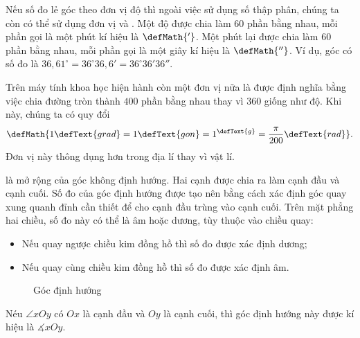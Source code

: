 Nếu số đo lẻ góc theo đơn vị độ thì ngoài việc sử dụng số thập phân, chúng ta còn có thể sử dụng đơn vị  và . Một độ được chia làm $60$ phần bằng nhau, mỗi phần gọi là một phút kí hiệu là $\defMath{'}$. Một phút lại được chia làm $60$ phần bằng nhau, mỗi phần gọi là một giây kí hiệu là $\defMath{''}$. Ví dụ, góc có số đo là $36{,}61^\circ = 36^\circ 36{,}6' = 36^\circ 36' 36''$.

Trên máy tính khoa học hiện hành còn một đơn vị nữa là  được định nghĩa bằng việc chia đường tròn thành $400$ phần bằng nhau thay vì $360$ giống như độ. Khi này, chúng ta có quy đổi $$\defMath{1\defText{ grad} = 1\defText{ gon} = 1^\defText{ g} = \frac{\pi}{200}\defText{ rad}}.$$
Đơn vị này thông dụng hơn trong địa lí thay vì vật lí.

 là mở rộng của góc không định hướng. Hai cạnh được chia ra làm cạnh đầu và cạnh cuối. Số đo của góc định hướng được tạo nên bằng cách xác định góc quay xung quanh đỉnh cần thiết để cho cạnh đầu trùng vào cạnh cuối. Trên mặt phẳng hai chiều, số đo này có thể là âm hoặc dương, tùy thuộc vào chiều quay:
\begin{itemize}
   \item Nếu quay ngược chiều kim đồng hồ thì số đo được xác định dương;
   \item Nếu quay cùng chiều kim đồng hồ thì số đo được xác định âm.
\end{itemize}

\begin{figure}[H]
   \centering
   \caption{Góc định hướng}
   \label{fig:toan_hoc_nen_tang:ham_luong_giac:goc_dinh_huong}
\end{figure}

Néu $\angle xOy$ có $Ox$ là cạnh đầu và $Oy$ là cạnh cuối, thì góc định hướng này được kí hiệu là $\measuredangle{xOy}$.
